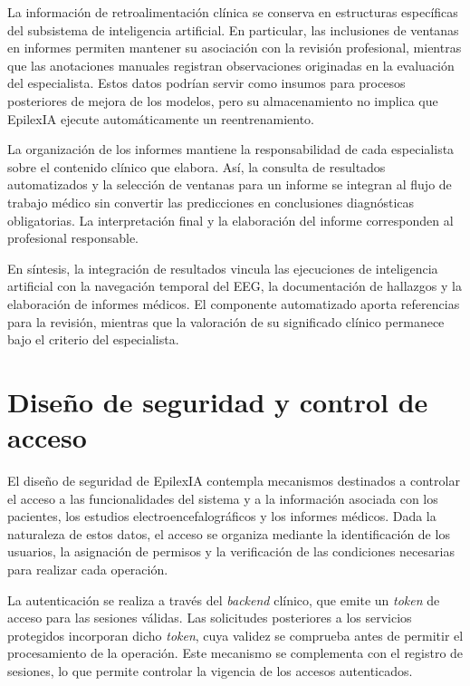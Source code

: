 La información de retroalimentación clínica se conserva en estructuras específicas del subsistema de inteligencia artificial. En particular, las inclusiones de ventanas en informes permiten mantener su asociación con la revisión profesional, mientras que las anotaciones manuales registran observaciones originadas en la evaluación del especialista. Estos datos podrían servir como insumos para procesos posteriores de mejora de los modelos, pero su almacenamiento no implica que EpilexIA ejecute automáticamente un reentrenamiento.

La organización de los informes mantiene la responsabilidad de cada especialista sobre el contenido clínico que elabora. Así, la consulta de resultados automatizados y la selección de ventanas para un informe se integran al flujo de trabajo médico sin convertir las predicciones en conclusiones diagnósticas obligatorias. La interpretación final y la elaboración del informe corresponden al profesional responsable.

En síntesis, la integración de resultados vincula las ejecuciones de inteligencia artificial con la navegación temporal del EEG, la documentación de hallazgos y la elaboración de informes médicos. El componente automatizado aporta referencias para la revisión, mientras que la valoración de su significado clínico permanece bajo el criterio del especialista.


\section{Diseño de seguridad y control de acceso}
\label{sec:seguridad-control-acceso}

El diseño de seguridad de EpilexIA contempla mecanismos destinados a controlar el acceso a las funcionalidades del sistema y a la información asociada con los pacientes, los estudios electroencefalográficos y los informes médicos. Dada la naturaleza de estos datos, el acceso se organiza mediante la identificación de los usuarios, la asignación de permisos y la verificación de las condiciones necesarias para realizar cada operación.

La autenticación se realiza a través del \textit{backend} clínico, que emite un \textit{token} de acceso para las sesiones válidas. Las solicitudes posteriores a los servicios protegidos incorporan dicho \textit{token}, cuya validez se comprueba antes de permitir el procesamiento de la operación. Este mecanismo se complementa con el registro de sesiones, lo que permite controlar la vigencia de los accesos autenticados.

